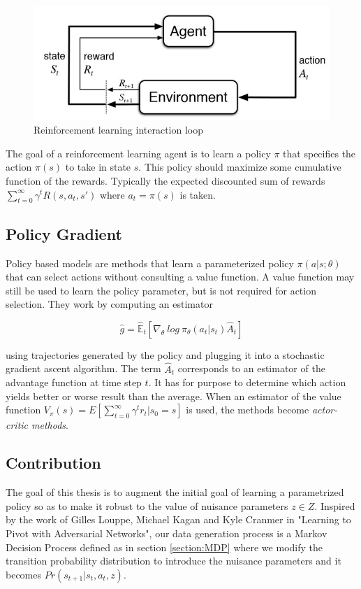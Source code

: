 \documentclass[]{article}
\begin{document}
\begin{figure}[h]
	\centering
	\includegraphics[scale=0.5]{rl-loop.jpg}
	\caption{Reinforcement learning interaction loop}
\end{figure}


The goal of a reinforcement learning agent is to learn a policy $\pi$ that specifies the action $\pi(s)$ to take in state $s$. This policy should maximize some cumulative function of the rewards. Typically the expected discounted sum of rewards $\sum_{t = 0}^{\infty} \gamma^t R(s, a_t, s')$ where $a_t = \pi(s)$ is taken.

\subsection{Policy Gradient}
Policy based models are methods that learn a parameterized policy $\pi (a | s; \theta)$ that can select actions without consulting a value function. A value function may still be used to learn the policy parameter, but is not required for action selection. They work by computing an estimator

\begin{equation}
\hat{g} = \hat{\mathbb{E}}_t [\nabla_\theta \ log\ \pi_\theta(a_t | s_t) \hat{A}_t]
\end{equation}

 using trajectories generated by the policy and plugging it into a stochastic gradient ascent algorithm. The term $\hat{A}_t$ corresponds to an estimator of the advantage function at time step $t$. It has for purpose to determine which action yields better or worse result than the average. When an estimator of the value function $V_\pi(s) = E[\sum_{t = 0}^{\infty} \gamma^tr_t | s_0 = s]$ is used, the methods become \textit{actor-critic methods}.

\subsection{Contribution}
The goal of this thesis is to augment the initial goal of learning a parametrized policy so as to make it robust to the value of nuisance parameters $z \in Z$. 
Inspired by the work of Gilles Louppe, Michael Kagan and Kyle Cranmer in "Learning to Pivot with Adversarial Networks", our data generation process is a Markov Decision Process defined as in section \ref{section:MDP} where we modify the transition probability distribution to introduce the nuisance parameters and it becomes $Pr(s_{t+1} | s_t, a_t, z)$.
\end{document}
